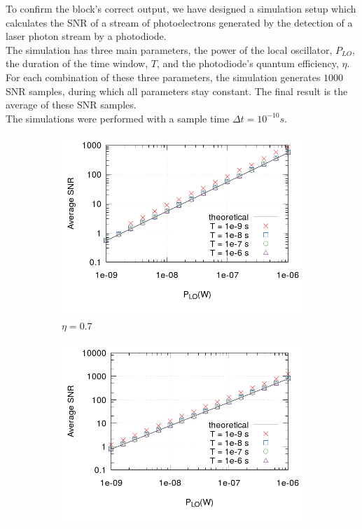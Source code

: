 \begin{refsection}
To confirm the block's correct output, we have designed a simulation setup which calculates the SNR of a stream of photoelectrons generated by the detection of a laser photon stream by a photodiode.\\
The simulation has three main parameters, the power of the local oscillator, $P_{LO}$, the duration of the time window, $T$, and the photodiode's quantum efficiency, $\eta$. For each combination of these three parameters, the simulation generates $1000$ SNR samples, during which all parameters stay constant.
The final result is the average of these SNR samples.\\
The simulations were performed with a sample time $\Delta t = 10^{-10} s$.
%
\begin{figure}[H]
	\centering
	\begin{subfigure}{0.45\textwidth}
		\includegraphics[width=\textwidth]{./lib/snr_photoelectron_generator/figures/plot-snr-eff-0_7.png}
		\caption{$\eta = 0.7$}
		\label{pl:sim-results-07}
	\end{subfigure}
	\hspace{10mm}
	\begin{subfigure}{0.45\textwidth}
		\includegraphics[width=\textwidth]{./lib/snr_photoelectron_generator/figures/plot-snr-eff-1.png}

\end{subfigure}
\end{figure}
\end{refsection}
